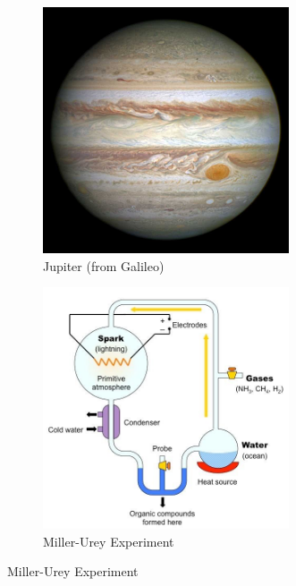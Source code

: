 \documentclass[]{article}
\begin{document}
\begin{figure}[H]
	\caption{Strongly reducing atmospheres}
	\begin{subfigure}[b]{0.45\textwidth}
		\centering
		\caption{Jupiter (from Galileo)}\label{fig:Jupiter-galileo}
		\includegraphics[width=0.8\textwidth]{Jupiter-galileo}
	\end{subfigure}
	\begin{subfigure}[b]{0.45\textwidth}
		\centering
		\caption{Miller-Urey Experiment}\label{fig:miller_urey3}
		\includegraphics[width=0.8\textwidth]{MillerUrey3}
	\end{subfigure}
\end{figure}
\end{document}
